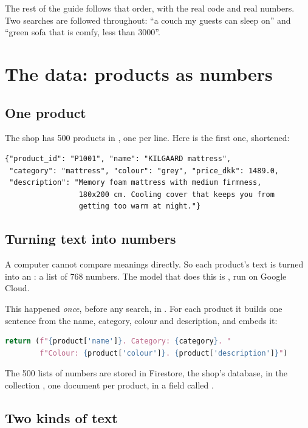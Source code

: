 \documentclass[11pt]{article}
\begin{document}
The rest of the guide follows that order, with the real code and real
numbers. Two searches are followed throughout: ``a couch my guests can
sleep on'' and ``green sofa that is comfy, less than 3000''.

\section{The data: products as numbers}
\label{sec:data}

\subsection{One product}

The shop has 500 products in , one per line.
Here is the first one, shortened:
\begin{lstlisting}
{"product_id": "P1001", "name": "KILGAARD mattress",
 "category": "mattress", "colour": "grey", "price_dkk": 1489.0,
 "description": "Memory foam mattress with medium firmness,
                 180x200 cm. Cooling cover that keeps you from
                 getting too warm at night."}
\end{lstlisting}

\subsection{Turning text into numbers}

A computer cannot compare meanings directly. So each product's text is
turned into an : a
list of 768 numbers. The model that does this is
, run on Google Cloud.

This happened \emph{once}, before any search, in
. For each product it builds one
sentence from the name, category, colour and description, and embeds
it:
\begin{lstlisting}[language=Python]
return (f"{product['name']}. Category: {category}. "
        f"Colour: {product['colour']}. {product['description']}")
\end{lstlisting}
The 500 lists of numbers are stored in Firestore, the shop's database,
in the collection , one document per product, in a
field called .

\subsection{Two kinds of text}
\end{document}

